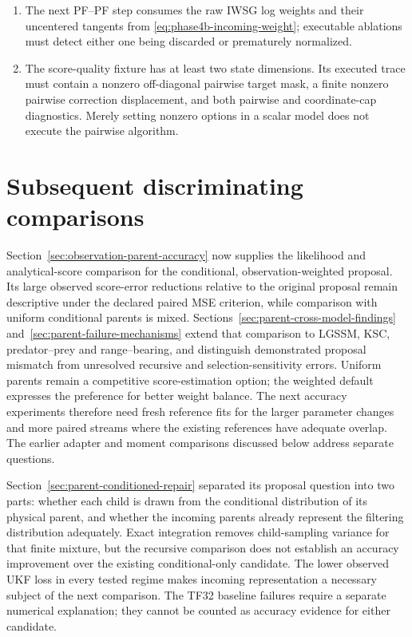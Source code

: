 \documentclass[11pt]{article}
\begin{document}
\begin{enumerate}[leftmargin=2em]
        evidence.
  \item The next PF--PF step consumes the raw IWSG log weights and their
        uncentered tangents from \eqref{eq:phase4b-incoming-weight}; executable
        ablations must detect either one being discarded or prematurely
        normalized.
  \item The score-quality fixture has at least two state dimensions.  Its
        executed trace must contain a nonzero off-diagonal pairwise target mask,
        a finite nonzero pairwise correction displacement, and both pairwise and
        coordinate-cap diagnostics.  Merely setting nonzero options in a scalar
        model does not execute the pairwise algorithm.
\end{enumerate}







\section{Subsequent discriminating comparisons}
\label{sec:next-study}

Section~\ref{sec:observation-parent-accuracy} now supplies the likelihood and
analytical-score comparison for the conditional, observation-weighted proposal.
Its large observed score-error reductions relative to the original proposal
remain descriptive under the declared paired MSE criterion, while comparison
with uniform conditional parents is mixed. Sections~\ref{sec:parent-cross-model-findings}
and~\ref{sec:parent-failure-mechanisms} extend that comparison to LGSSM, KSC,
predator--prey and range--bearing, and distinguish demonstrated proposal
mismatch from unresolved recursive and selection-sensitivity errors. Uniform
parents remain a competitive score-estimation option; the weighted default
expresses the preference for better weight balance. The next accuracy experiments
therefore need fresh reference fits for the larger parameter changes and more
paired streams where the existing references have adequate overlap. The earlier
adapter and moment comparisons discussed below address separate questions.

Section~\ref{sec:parent-conditioned-repair} separated its proposal
question into two parts: whether each child is drawn from the conditional
distribution of its physical parent, and whether the incoming parents already
represent the filtering distribution adequately. Exact integration removes
child-sampling variance for that finite mixture, but the recursive comparison
does not establish an accuracy improvement over the existing conditional-only
candidate. The lower observed UKF loss in every tested regime makes incoming
representation a necessary subject of the next comparison. The TF32 baseline
failures require a separate numerical explanation; they cannot be counted as
accuracy evidence for either candidate.
\end{document}
